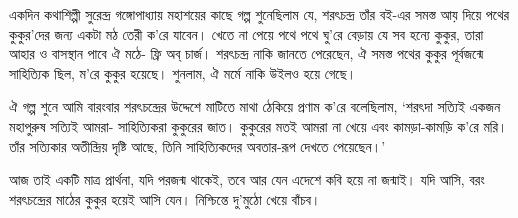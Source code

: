 \documentclass[a4paper,11pt]{article}
\begin{document}
\begin{multicols}{3}
{\begin{spacing}{1.15}
একদিন কথাশিল্পী সুরেন্দ্র গঙ্গোপাধ্যায় মহাশয়ের কাছে গল্প শুনেছিলাম যে, শরৎচন্দ্র তাঁর বই-এর সমস্ত আয় দিয়ে পথের কুকুর’দের জন্য একটা মঠ তেরী ক’রে যাবেন। খেতে না পেয়ে পথে পথে ঘু’রে বেড়ায় যে সব হন্যে কুকুর, তারা আহার ও বাসস্থান পাবে ঐ মঠে- ফ্রি অব্ চার্জ। শরৎচন্দ্র নাকি জানতে পেরেছেন, ঐ সমস্ত পথের কুকুর পূর্বজন্মে সাহিত্যিক ছিল, ম’রে কুকুর হয়েছে। শুনলাম, ঐ মর্মে নাকি উইলও হয়ে গেছে।

ঐ গল্প শুনে আমি বারংবার শরৎচন্দ্রের উদ্দেশে মাটিতে মাথা ঠেকিয়ে প্রণাম ক’রে বলেছিলাম, ‘শরৎদা সত্যিই একজন মহাপুরুষ সত্যিই আমরা- সাহিত্যিকরা কুকুরের জাত। কুকুরের মতই আমরা না খেয়ে এবং কামড়া-কামড়ি ক’রে মরি। তাঁর সত্যিকার অতীন্দ্রিয় দৃষ্টি আছে, তিনি সাহিত্যিকদের অবতার-রূপ দেখতে পেয়েছেন।’

আজ তাই একটি মাত্র প্রার্থনা, যদি পরজন্ম থাকেই, তবে আর যেন এদেশে কবি হয়ে না জন্মাই। যদি আসি, বরং শরৎচন্দ্রের মাঠের কুকুর হয়েই আসি যেন। নিশ্চিন্তে দু’মুঠো খেয়ে বাঁচব।

\end{spacing}
\closearticle}
\end{multicols}
\end{document}
